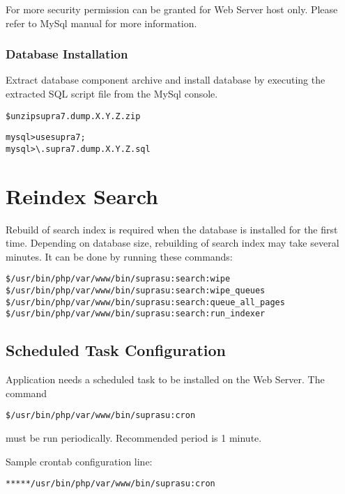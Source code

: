 \documentclass[12pt]{article}
\newcommand{\vigProjectNameShort}{supra7}
\newcommand{\vigPackageName}{supra7}
\newcommand{\vigPathToProject}{/var/www}
\begin{document}
For more security permission can be granted for Web Server host only. Please refer to MySql manual for more information.

\subsubsection{Database Installation}
Extract database component archive and install database by executing the extracted SQL script file from the MySql console.

\begin{alltt}
\$ unzip {\vigPackageName}.dump.X.Y.Z.zip
\end{alltt}

\begin{alltt}
mysql> use \vigProjectNameShort;
mysql> \textbackslash. {\vigPackageName}.dump.X.Y.Z.sql
\end{alltt}

\section{Reindex Search}
Rebuild of search index is required when the database is installed for the first time. Depending on database size, rebuilding of search index may take several minutes. It can be done by running these commands:

\begin{alltt}
\$ /usr/bin/php \vigPathToProject/bin/supra su:search:wipe
\$ /usr/bin/php \vigPathToProject/bin/supra su:search:wipe_queues
\$ /usr/bin/php \vigPathToProject/bin/supra su:search:queue_all_pages
\$ /usr/bin/php \vigPathToProject/bin/supra su:search:run_indexer
\end{alltt}

\subsection{Scheduled Task Configuration}

Application needs a scheduled task to be installed on the Web Server. The command

\begin{alltt}
\$ /usr/bin/php \vigPathToProject/bin/supra su:cron
\end{alltt}

must be run periodically. Recommended period is 1 minute.

Sample \textsf{crontab} configuration line:

\begin{alltt}
* * * * * /usr/bin/php \vigPathToProject/bin/supra su:cron
\end{alltt}
\end{document}
